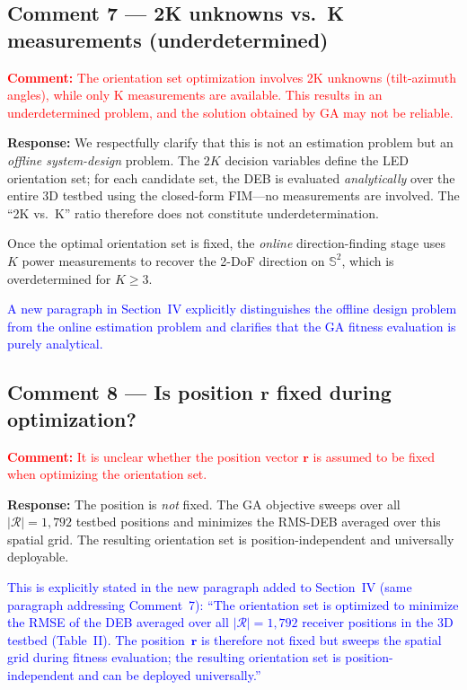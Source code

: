 \documentclass[11pt]{article}
\newcommand{\reviewercomment}[1]{\noindent\textcolor{red}{\textbf{Comment:} #1}\par\vspace{6pt}}
\newcommand{\response}{\noindent\textbf{Response:} }
\newcommand{\change}[1]{\textcolor{blue}{#1}}
\begin{document}
\subsection{Comment 7 --- 2K unknowns vs.\ K measurements (underdetermined)}

\reviewercomment{The orientation set optimization involves 2K unknowns (tilt-azimuth angles), while only K measurements are available. This results in an underdetermined problem, and the solution obtained by GA may not be reliable.}

\response We respectfully clarify that this is not an estimation problem but an \emph{offline system-design} problem. The $2K$ decision variables define the LED orientation set; for each candidate set, the DEB is evaluated \emph{analytically} over the entire 3D testbed using the closed-form FIM---no measurements are involved. The ``2K vs.\ K'' ratio therefore does not constitute underdetermination.

Once the optimal orientation set is fixed, the \emph{online} direction-finding stage uses $K$ power measurements to recover the 2-DoF direction on $\mathbb{S}^2$, which is overdetermined for $K \geq 3$.

\change{A new paragraph in Section~IV explicitly distinguishes the offline design problem from the online estimation problem and clarifies that the GA fitness evaluation is purely analytical.}

\subsection{Comment 8 --- Is position $\mathbf{r}$ fixed during optimization?}

\reviewercomment{It is unclear whether the position vector $\mathbf{r}$ is assumed to be fixed when optimizing the orientation set.}

\response The position is \emph{not} fixed. The GA objective sweeps over all $|\mathcal{R}| = 1{,}792$ testbed positions and minimizes the RMS-DEB averaged over this spatial grid. The resulting orientation set is position-independent and universally deployable.

\change{This is explicitly stated in the new paragraph added to Section~IV (same paragraph addressing Comment~7): ``The orientation set is optimized to minimize the RMSE of the DEB averaged over all $|\mathcal{R}|=1{,}792$ receiver positions in the 3D testbed (Table~II). The position~$\mathbf{r}$ is therefore not fixed but sweeps the spatial grid during fitness evaluation; the resulting orientation set is position-independent and can be deployed universally.''}
\end{document}
